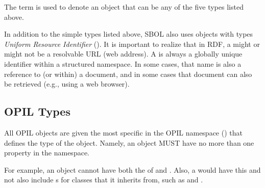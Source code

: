 The term  is used to denote an object that can be any of the five types listed above.

In addition to the simple types listed above, SBOL also uses objects with types \emph{Uniform Resource Identifier} (). It is important to realize that in RDF, a  might or might not be a resolvable URL (web address).  A  is always a globally unique identifier within a structured namespace.  In some cases, that name is also a reference to (or within) a document, and in some cases that document can also be retrieved (e.g., using a web browser).

\subsection{OPIL Types}
\label{sec:sbolTypes}

All OPIL objects are given the most specific  in the OPIL namespace () that defines the type of the object.  Namely, an object MUST have no more than one  property in the  namespace.

For example, an object cannot have both the  of  and .  Also, a  would have this  and not also include s for classes that it inherits from, such as  and .


